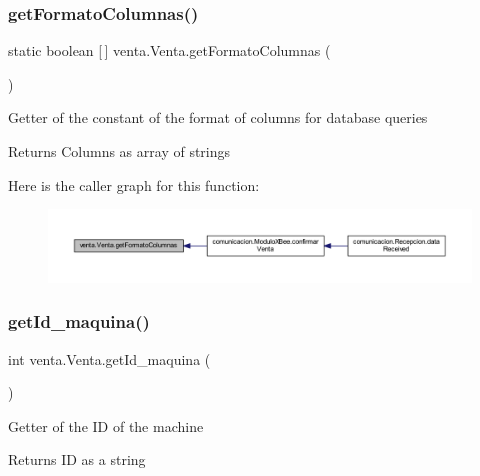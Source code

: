 \subsubsection{\texorpdfstring{get\+Formato\+Columnas()}{getFormatoColumnas()}}
{\footnotesize\ttfamily static boolean \mbox{[}$\,$\mbox{]} venta.\+Venta.\+get\+Formato\+Columnas (\begin{DoxyParamCaption}{ }\end{DoxyParamCaption})\hspace{0.3cm}{\ttfamily [static]}}

Getter of the constant of the format of columns for database queries

\begin{DoxyReturn}{Returns}
Columns as array of strings 
\end{DoxyReturn}
Here is the caller graph for this function\+:
\nopagebreak
\begin{figure}[H]
\begin{center}
\leavevmode
\includegraphics[width=350pt]{classventa_1_1_venta_a82a6dd2795bd37dc1a72ffb5cb36a156_icgraph}
\end{center}
\end{figure}
\mbox{\label{classventa_1_1_venta_a07718971227218ff55a5cf0c44c03059}} 
\subsubsection{\texorpdfstring{get\+Id\+\_\+maquina()}{getId\_maquina()}}
{\footnotesize\ttfamily int venta.\+Venta.\+get\+Id\+\_\+maquina (\begin{DoxyParamCaption}{ }\end{DoxyParamCaption})}

Getter of the ID of the machine

\begin{DoxyReturn}{Returns}
ID as a string 
\end{DoxyReturn}
\mbox{\label{classventa_1_1_venta_a85785872bbb69c39c36493c9ac0ef944}} 
